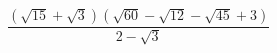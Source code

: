 \begin{ex}[type=calculate]
	\begin{condition}
		\( \dfrac{(\sqrt{15}+\sqrt{3})(\sqrt{60}-\sqrt{12}-\sqrt{45}+3)}{2-\sqrt{3}} \)
	\end{condition}
\end{ex}